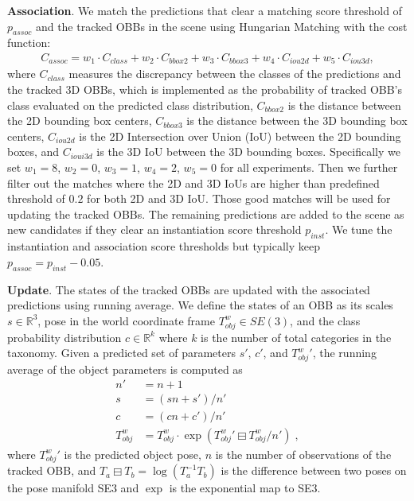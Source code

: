 \noindent \textbf{Association}. We match the predictions that clear a matching score threshold of $p_{assoc}$ and the tracked OBBs in the scene using Hungarian Matching with the cost function:
\begin{align}
C_{assoc} = w_1 \cdot C_{class} + w_2 \cdot C_{bbox2} + w_3 \cdot C_{bbox3} + w_4 \cdot C_{iou2d} + w_5 \cdot C_{iou3d},
\end{align}
where $C_{class}$ measures the discrepancy between the classes of the predictions and the tracked 3D OBBs, which is implemented as the probability of tracked OBB’s class evaluated on the predicted class distribution, $C_{bbox2}$ is the distance between the 2D bounding box centers, $C_{bbox3}$ is the distance between the 3D bounding box centers, $C_{iou2d}$ is the 2D Intersection over Union (IoU) between the 2D bounding boxes, and $C_{ioui3d}$ is the 3D IoU between the 3D bounding boxes. 
Specifically we set $w_1=8$, $w_2=0$, $w_3=1$, $w_4=2$, $w_5=0$ for all experiments.
Then we further filter out the matches where the 2D and 3D IoUs are higher than predefined threshold of $0.2$ for both 2D and 3D IoU.
Those good matches will be used for updating the tracked OBBs. The remaining predictions are added to the scene as new candidates if they clear an instantiation score threshold $p_{inst}$. We tune the instantiation and association score thresholds but typically keep $p_{assoc} = p_{inst} - 0.05$. 

\noindent \textbf{Update}. The states of the tracked OBBs are updated with the associated predictions using running average. We define the states of an OBB as its scales $s \in \mathbb{R}^3$, pose in the world coordinate frame $T_{obj}^{w} \in SE(3)$, and the class probability distribution $c \in \mathbb{R}^k$ where $k$ is the number of total categories in the taxonomy. 
Given a predicted set of parameters $s'$, $c'$, and ${T_{obj}^{w}}'$, the running average of the object parameters is computed as
\begin{align}
    n' &= n+1 \\
    s &= (s n + s') / n'\\
    c &=  (c n + c') / n'\\
    T_{obj}^{w} &= T_{obj}^{w} \cdot \exp{({T_{obj}^{w}}' \boxminus T_{obj}^{w} / n')} \;,
\end{align}
where ${T_{obj}^{w}}'$ is the predicted object pose, $n$ is the number of observations of the tracked OBB, and $T_a \boxminus T_b = \log(T_a^{-1} T_b)$ is the difference between two poses on the pose manifold SE3 and $\exp{}$ is the exponential map to SE3. 

